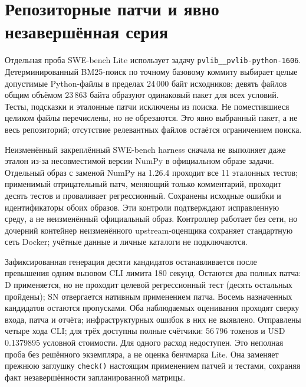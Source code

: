\section{Репозиторные патчи и явно незавершённая серия}
\label{sec:swe-dev1}

Отдельная проба SWE-bench Lite использует задачу \texttt{pvlib\_\_pvlib-python-1606}. Детерминированный BM25-поиск по точному базовому коммиту выбирает целые допустимые Python-файлы в пределах 24\,000 байт исходников; девять файлов общим объёмом 23\,863 байта образуют одинаковый пакет для всех условий. Тесты, подсказки и эталонные патчи исключены из поиска. Не поместившиеся целиком файлы перечислены, но не обрезаются. Это явно выбранный пакет, а не весь репозиторий; отсутствие релевантных файлов остаётся ограничением поиска.

Неизменённый закреплённый SWE-bench harness сначала не выполняет даже эталон из-за несовместимой версии NumPy в официальном образе задачи. Отдельный образ с заменой NumPy на 1.26.4 проходит все 11 эталонных тестов; применимый отрицательный патч, меняющий только комментарий, проходит десять тестов и проваливает регрессионный. Сохранены исходные ошибки и идентификаторы обоих образов. Эти контроли подтверждают исправленную среду, а не неизменённый официальный образ. Контроллер работает без сети, но дочерний контейнер неизменённого upstream-оценщика сохраняет стандартную сеть Docker; учётные данные и личные каталоги не подключаются.

Зафиксированная генерация десяти кандидатов останавливается после превышения одним вызовом CLI лимита 180 секунд. Остаются два полных патча: D применяется, но не проходит целевой регрессионный тест (десять остальных пройдены); SN отвергается нативным применением патча. Восемь назначенных кандидатов остаются пропусками. Оба наблюдаемых оценивания проходят сверку входа, патча и отчёта; инфраструктурных ошибок в них не выявлено. Отправлены четыре хода CLI; для трёх доступны полные счётчики: 56\,796 токенов и USD 0.1379895 условной стоимости. Для одного расход недоступен. Это неполная проба без решённого экземпляра, а не оценка бенчмарка Lite. Она заменяет прежнюю заглушку \texttt{check()} настоящим применением патчей и тестами, сохраняя факт незавершённости запланированной матрицы.

